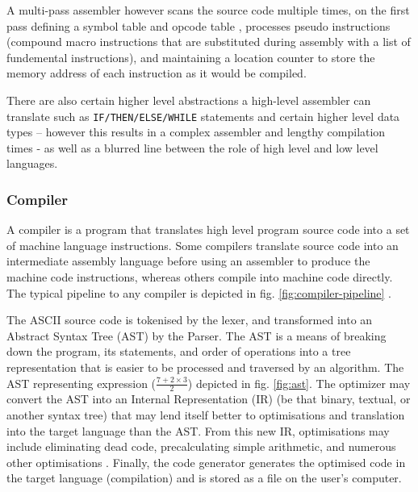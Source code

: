 A multi-pass assembler however scans the source code multiple times, on the first pass defining a symbol table and opcode table \textcite{TOPPR-assembler}, processes pseudo instructions (compound macro instructions that are substituted during assembly with a list of fundemental instructions), and maintaining a location counter to store the memory address of each instruction as it would be compiled.

There are also certain higher level abstractions a high-level assembler can translate such as \texttt{IF/THEN/ELSE/WHILE} statements and certain higher level data types – however this results in a complex assembler and lengthy compilation times - as well as a blurred line between the role of high level and low level languages. 

\subsubsection{Compiler}
\label{sec:Compiler}
A compiler is a program that translates high level program source code into a set of machine language instructions. Some compilers translate source code into an intermediate assembly language before using an assembler to produce the machine code instructions, whereas others compile into machine code directly. The typical pipeline to any compiler is depicted in fig. \ref{fig:compiler-pipeline} \textcite{Ball-WritingACompilerInGo}.

\bigskip

\begin{figure}%
    \centering
    \qquad
\end{figure}

\bigskip


The ASCII source code is tokenised by the lexer, and transformed into an Abstract Syntax Tree (AST) by the Parser. The AST is a means of breaking down the program, its statements, and order of operations into a tree representation that is easier to be processed and traversed by an algorithm. The AST representing expression ($\frac{7+2\times3}{2}$) depicted in fig. \ref{fig:ast}. The optimizer may convert the AST into an Internal Representation (IR) (be that binary, textual, or another syntax tree) that may lend itself better to optimisations and translation into the target language than the AST. From this new IR, optimisations may include eliminating dead code, precalculating simple arithmetic, and numerous other optimisations \textcite{Ball-WritingACompilerInGo}. Finally, the code generator generates the optimised code in the target language (compilation) and is stored as a file on the user's computer.

